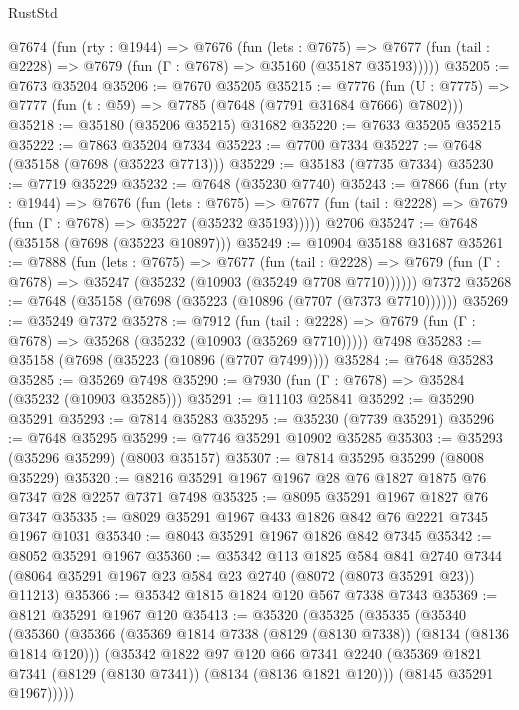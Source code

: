 \begin{lexlean}{RustStd}
\begin{coremodule}
  @7674
    (fun (rty : @1944) =>
    @7676
      (fun (lets : @7675) =>
      @7677 (fun (tail : @2228) => @7679 (fun (Γ : @7678) => @35160 (@35187 @35193)))))
@35205 := @7673 @35204
@35206 := @7670 @35205
@35215 := @7776
    (fun (U : @7775) => @7777 (fun (t : @59) => @7785 (@7648 (@7791 @31684 @7666) @7802)))
@35218 := @35180 (@35206 @35215) @31682
@35220 := @7633 @35205 @35215
@35222 := @7863 @35204 @7334
@35223 := @7700 @7334
@35227 := @7648 (@35158 (@7698 (@35223 @7713)))
@35229 := @35183 (@7735 @7334)
@35230 := @7719 @35229
@35232 := @7648 (@35230 @7740)
@35243 := @7866
    (fun (rty : @1944) =>
    @7676
      (fun (lets : @7675) =>
      @7677 (fun (tail : @2228) => @7679 (fun (Γ : @7678) => @35227 (@35232 @35193)))))
    @2706
@35247 := @7648 (@35158 (@7698 (@35223 @10897)))
@35249 := @10904 @35188 @31687
@35261 := @7888
    (fun (lets : @7675) =>
    @7677
      (fun (tail : @2228) =>
      @7679 (fun (Γ : @7678) => @35247 (@35232 (@10903 (@35249 @7708 @7710))))))
    @7372
@35268 := @7648 (@35158 (@7698 (@35223 (@10896 (@7707 (@7373 @7710))))))
@35269 := @35249 @7372
@35278 := @7912
    (fun (tail : @2228) => @7679 (fun (Γ : @7678) => @35268 (@35232 (@10903 (@35269 @7710)))))
    @7498
@35283 := @35158 (@7698 (@35223 (@10896 (@7707 @7499))))
@35284 := @7648 @35283
@35285 := @35269 @7498
@35290 := @7930 (fun (Γ : @7678) => @35284 (@35232 (@10903 @35285)))
@35291 := @11103 @25841
@35292 := @35290 @35291
@35293 := @7814 @35283
@35295 := @35230 (@7739 @35291)
@35296 := @7648 @35295
@35299 := @7746 @35291 @10902 @35285
@35303 := @35293 (@35296 @35299) (@8003 @35157)
@35307 := @7814 @35295 @35299 (@8008 @35229)
@35320 := @8216 @35291 @1967 @1967 @28 @76 @1827 @1875 @76 @7347 @28 @2257 @7371 @7498
@35325 := @8095 @35291 @1967 @1827 @76 @7347
@35335 := @8029 @35291 @1967 @433 @1826 @842 @76 @2221 @7345 @1967 @1031
@35340 := @8043 @35291 @1967 @1826 @842 @7345
@35342 := @8052 @35291 @1967
@35360 := @35342
    @113
    @1825
    @584
    @841
    @2740
    @7344
    (@8064 @35291 @1967 @23 @584 @23 @2740 (@8072 (@8073 @35291 @23)) @11213)
@35366 := @35342 @1815 @1824 @120 @567 @7338 @7343
@35369 := @8121 @35291 @1967 @120
@35413 := @35320
    (@35325
      (@35335
        (@35340
          (@35360
            (@35366
              (@35369 @1814 @7338 (@8129 (@8130 @7338)) (@8134 (@8136 @1814 @120)))
              (@35342
                @1822
                @97
                @120
                @66
                @7341
                @2240
                (@35369 @1821 @7341 (@8129 (@8130 @7341)) (@8134 (@8136 @1821 @120)))
                (@8145 @35291 @1967)))))

\end{coremodule}
\end{lexlean}
